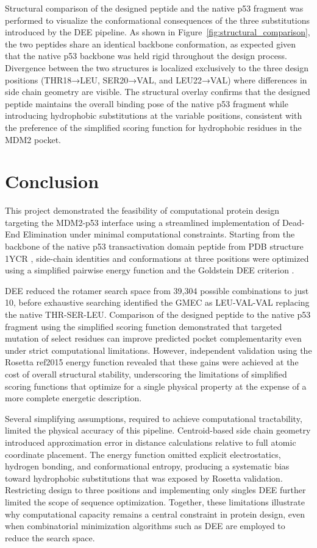 Structural comparison of the designed peptide and the native p53 fragment was performed to visualize the conformational consequences of the three substitutions introduced by the DEE pipeline. As shown in Figure~\ref{fig:structural_comparison}, the two peptides share an identical backbone conformation, as expected given that the native p53 backbone was held rigid throughout the design process. Divergence between the two structures is localized exclusively to the three design positions (THR18→LEU, SER20→VAL, and LEU22→VAL) where differences in side chain geometry are visible. The structural overlay confirms that the designed peptide maintains the overall binding pose of the native p53 fragment while introducing hydrophobic substitutions at the variable positions, consistent with the preference of the simplified scoring function for hydrophobic residues in the MDM2 pocket.

\section{Conclusion}
This project demonstrated the feasibility of computational protein design targeting the MDM2-p53 interface using a streamlined implementation of Dead-End Elimination under minimal computational constraints. Starting from the backbone of the native p53 transactivation domain peptide from PDB structure 1YCR \cite{PDB}, side-chain identities and conformations at three positions were optimized using a simplified pairwise energy function and the Goldstein DEE criterion \cite{Dahiyat}.

DEE reduced the rotamer search space from 39,304 possible combinations to just 10, before exhaustive searching identified the GMEC as LEU-VAL-VAL replacing the native THR-SER-LEU. Comparison of the designed peptide to the native p53 fragment using the simplified scoring function demonstrated that targeted mutation of select residues can improve predicted pocket complementarity even under strict computational limitations. However, independent validation using the Rosetta ref2015 energy function \cite{RosettaScoring} revealed that these gains were achieved at the cost of overall structural stability, underscoring the limitations of simplified scoring functions that optimize for a single physical property at the expense of a more complete energetic description.

Several simplifying assumptions, required to achieve computational tractability, limited the physical accuracy of this pipeline. Centroid-based side chain geometry introduced approximation error in distance calculations relative to full atomic coordinate placement. The energy function omitted explicit electrostatics, hydrogen bonding, and conformational entropy, producing a systematic bias toward hydrophobic substitutions that was exposed by Rosetta validation. Restricting design to three positions and implementing only singles DEE further limited the scope of sequence optimization. Together, these limitations illustrate why computational capacity remains a central constraint in protein design, even when combinatorial minimization algorithms such as DEE are employed to reduce the search space.

